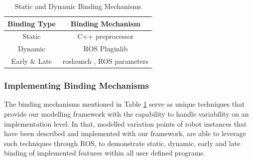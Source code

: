 \documentclass[conference]{IEEEtran}
\begin{document}
\begin{table}[H]
	\caption{Static and Dynamic Binding Mechanisms}
	\begin{center}
		\begin{tabular}{|c|c|}
			\hline
			Binding Type & Binding Mechanism \\ \hline
			Static & C++ preprocessor \\ \hline
			Dynamic &  ROS Pluginlib  \\ \hline
			Early \& Late &  roslaunch , ROS parameters  \\ \hline
			
		\end{tabular}
		\label{tab:realmecha}
	\end{center}
\end{table}

\subsubsection{Implementing Binding Mechanisms}
The binding mechanisms mentioned in Table \ref{tab:realmecha} serve as unique techniques that provide our modelling framework with the capability to handle variability on an implementation level. In that, modelled variation points of robot instances that have been described and implemented with our framework, are able to leverage such techniques through ROS, to demonstrate static, dynamic, early and late binding of implemented features within all user defined programs.
\end{document}
